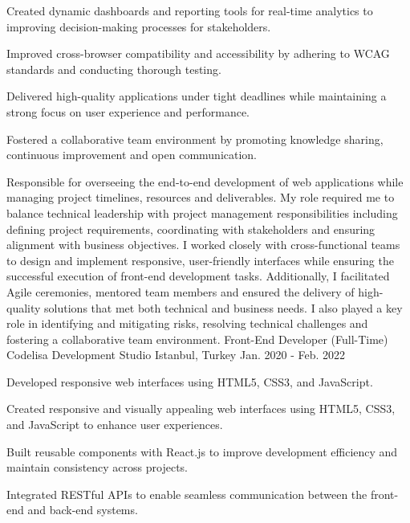 \begin{cventries}
{\begin{cvitems}
        \item {Created dynamic dashboards and reporting tools for real-time analytics to improving decision-making processes for stakeholders.}
        \item {Improved cross-browser compatibility and accessibility by adhering to WCAG standards and conducting thorough testing.}
        \item {Delivered high-quality applications under tight deadlines while maintaining a strong focus on user experience and performance.}
        \item {Fostered a collaborative team environment by promoting knowledge sharing, continuous improvement and open communication.}
      \end{cvitems}
    }
    {
      Responsible for overseeing the end-to-end development of web applications while managing project timelines, resources and deliverables. My role required me to balance technical leadership with project management responsibilities including defining project requirements, coordinating with stakeholders and ensuring alignment with business objectives. I worked closely with cross-functional teams to design and implement responsive, user-friendly interfaces while ensuring the successful execution of front-end development tasks. Additionally, I facilitated Agile ceremonies, mentored team members and ensured the delivery of high-quality solutions that met both technical and business needs. I also played a key role in identifying and mitigating risks, resolving technical challenges and fostering a collaborative team environment.
    }
  \vspace{3em}
  \cvnewexperience
    {Front-End Developer (Full-Time)} %
    {Codelisa Development Studio} %
    {Istanbul, Turkey} %
    {Jan. 2020 - Feb. 2022} %
    {
      \begin{cvitems} %
        \item {Developed responsive web interfaces using HTML5, CSS3, and JavaScript.}
        \item {Created responsive and visually appealing web interfaces using HTML5, CSS3, and JavaScript to enhance user experiences.}
        \item {Built reusable components with React.js to improve development efficiency and maintain consistency across projects.}
        \item {Integrated RESTful APIs to enable seamless communication between the front-end and back-end systems.}

\end{cvitems}}
\end{cventries}
